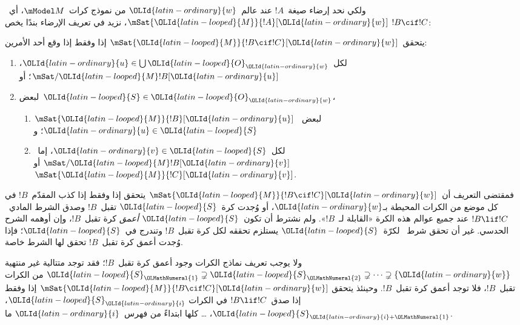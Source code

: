 \documentclass[../../../include/open-logic-section]{subfiles}
\begin{document}
ولكي نحد إرضاء صيغة~$!A$ عند عالم~${\OLId{latin-ordinary}{w}}$ من نموذج كرات~$\mModel M$،
أي~$\mSat{{\OLId{latin-looped}{M}}}{!A}[{\OLId{latin-ordinary}{w}}]$، نزيد في تعريف الإرضاء بندًا يخص
$!B \cif !C$:

\begin{defn}
  يتحقق~$\mSat{{\OLId{latin-looped}{M}}}{!B \cif !C}[{\OLId{latin-ordinary}{w}}]$ إذا وفقط إذا وقع أحد الأمرين:
  \begin{enumerate}
  \item{} لكل~${\OLId{latin-ordinary}{u}} \in \bigcup {\OLId{latin-looped}{O}}_{\OLId{latin-ordinary}{w}}$،
    $\mSat/{{\OLId{latin-looped}{M}}}{!B}[{\OLId{latin-ordinary}{u}}]$؛ أو
  \item{} لبعض~${\OLId{latin-looped}{S}} \in {\OLId{latin-looped}{O}}_{\OLId{latin-ordinary}{w}}$،
    \begin{enumerate}
      \item $\mSat{{\OLId{latin-looped}{M}}}{!B}[{\OLId{latin-ordinary}{u}}]$ لبعض~${\OLId{latin-ordinary}{u}} \in {\OLId{latin-looped}{S}}$؛ و
      \item لكل~${\OLId{latin-ordinary}{v}} \in {\OLId{latin-looped}{S}}$، إما~$\mSat/{{\OLId{latin-looped}{M}}}{!B}[{\OLId{latin-ordinary}{v}}]$ أو
        $\mSat{{\OLId{latin-looped}{M}}}{!C}[{\OLId{latin-ordinary}{v}}]$.
    \end{enumerate}
  \end{enumerate}
\end{defn}

فمقتضى التعريف أن~$\mSat{{\OLId{latin-looped}{M}}}{!B \cif !C}[{\OLId{latin-ordinary}{w}}]$ يتحقق إذا وفقط إذا كذب
المقدّم~$!B$ في كل موضع من الكرات المحيطة بـ${\OLId{latin-ordinary}{w}}$، أو وُجدت كرة~${\OLId{latin-looped}{S}}$
تقبل~$!B$ وصدق الشرط المادي~$!B \lif !C$ عند جميع عوالم هذه الكرة
«القابلة لـ~$!B$». ولم نشترط أن تكون~${\OLId{latin-looped}{S}}$ \emph{أعمق} كرة تقبل~$!B$،
وإن أوهمه الشرح الحدسي. غير أن تحقق شرط~ لكرّة~${\OLId{latin-looped}{S}}$
يستلزم تحققه لكل كرة تقبل~$!B$ وتندرج في~${\OLId{latin-looped}{S}}$؛ فإذا وُجدت أعمق كرة
تقبل~$!B$ تحقق لها الشرط خاصة.

ولا يوجب تعريف نماذج الكرات وجود أعمق كرة تقبل~$!B$؛ فقد توجد متتالية
غير منتهية
${\OLId{latin-looped}{S}}_{\OLMathNumeral{1}} \supsetneq {\OLId{latin-looped}{S}}_{\OLMathNumeral{2}} \supsetneq \dots \supsetneq \{{\OLId{latin-ordinary}{w}}\}$ من الكرات
تقبل~$!B$، فلا توجد أعمق كرة تقبل~$!B$. وحينئذ يتحقق
$\mSat{{\OLId{latin-looped}{M}}}{!B \cif !C}[{\OLId{latin-ordinary}{w}}]$ إذا وفقط إذا صدق~$!B \lif !C$ في الكرات
${\OLId{latin-looped}{S}}_{\OLId{latin-ordinary}{i}}$، ${\OLId{latin-looped}{S}}_{{\OLId{latin-ordinary}{i}}+{\OLMathNumeral{1}}}$، \dots{} كلها ابتداءً من فهرس~${\OLId{latin-ordinary}{i}}$ ما.
\end{document}
